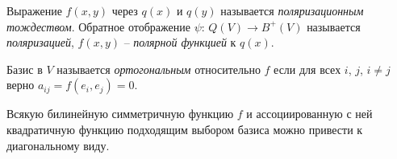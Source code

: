 \begin{definition}
    Выражение $f(x, y)$ через $q(x)$ и $q(y)$ называется \textit{поляризационным тождеством}.
    Обратное отображение $\psi:\, Q(V) \to B^+(V)$ называется \textit{поляризацией},
    $f(x, y)$ -- \textit{полярной функцией} к $q(x)$.
\end{definition}

\begin{definition}
    Базис в $V$ называется \textit{ортогональным} относительно $f$ если для всех $i$, $j$, $i \neq j$ верно 
    $a_{ij} = f(e_i, e_j) = 0$.
\end{definition}

\begin{theorem}[Лагранжа]
    Всякую билинейную симметричную функцию $f$ и ассоциированную с ней квадратичную функцию 
    подходящим выбором базиса можно привести к диагональному виду.
\end{theorem}

